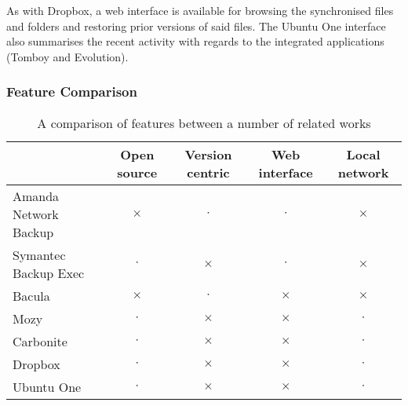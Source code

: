 \begin{bibunit}[plain]
As with Dropbox, a web interface is available for browsing the synchronised
files and folders and restoring prior versions of said files. The Ubuntu One
interface also summarises the recent activity with regards to the integrated
applications (Tomboy and Evolution).


\subsubsection{Feature Comparison}

\begin{table}[H]
    \centering
    \begin{tabular}{ | l | c | c | c | c | }
        \hline
        & Open source   & Version centric   & Web interface & Local network
            \\ \hline

        Amanda Network Backup   & $\times$  & $\cdot$   & $\cdot$   & $\times$
            \\ \hline

        Symantec Backup Exec    & $\cdot$   & $\times$  & $\cdot$   & $\times$
            \\ \hline

        Bacula                  & $\times$  & $\cdot$   & $\times$  & $\times$
            \\ \hline

        Mozy                    & $\cdot$   & $\times$  & $\times$  & $\cdot$
            \\ \hline

        Carbonite               & $\cdot$   & $\times$  & $\times$  & $\cdot$
            \\ \hline

        Dropbox                 & $\cdot$   & $\times$  & $\times$  & $\cdot$
            \\ \hline

        Ubuntu One              & $\cdot$   & $\times$  & $\times$  & $\cdot$
            \\ \hline
    \end{tabular}
    \caption{A comparison of features between a number of related works}
    \label{tab:feature-comparison}
\end{table}

\putbib[research]

\end{bibunit}
